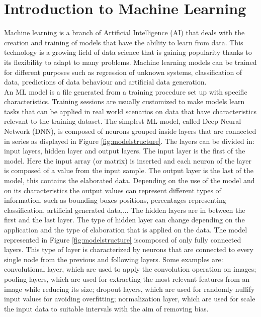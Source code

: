 \documentclass[12pt]{report}
\begin{document}
\section{Introduction to Machine Learning}
Machine learning is a branch of Artificial Intelligence (AI) that deals with the creation and training of models that have the ability to learn from data. This technology is a growing field of data science that is gaining popularity thanks to its flexibility to adapt to many problems. Machine learning models can be trained for different purposes such as regression of unknown systems, classification of data, predictions of data behaviour and artificial data generation.\\
An ML model is a file generated from a training procedure set up with specific characteristics. Training sessions are usually customized to make models learn tasks that can be applied in real world scenarios on data that have characteristics relevant to the training dataset. The simplest ML model, called Deep Neural Network (DNN), is composed of neurons grouped inside layers that are connected in series as displayed in Figure \ref{fig:modelstructure}. The layers can be divided in: input layers, hidden layer and output layers. 
The input layer is the first of the model. Here the input array (or matrix) is inserted and each neuron of the layer is composed of a value from the input sample. 
The output layer is the last of the model, this contains the elaborated data. Depending on the use of the model and on its characteristics the output values can represent different types of information, such as bounding boxes positions, percentages representing classification, artificial generated data,... 
The hidden layers are in between the first and the last layer. The type of hidden layer can change depending on the application and the type of elaboration that is applied on the data. The model represented in  Figure \ref{fig:modelstructure} iscomposed of only fully connected layers. This type of layer is characterized by neurons that are connected to every single node from the previous and following layers. Some examples are: convolutional layer, which are used to apply the convolution operation on images; pooling layers, which are used for extracting the most relevant features from an image while reducing its size; dropout layers, which are used for randomly nullify input values for avoiding overfitting; normalization layer, which are used for scale the input data to suitable intervals with the aim of removing bias. \\
\end{document}
